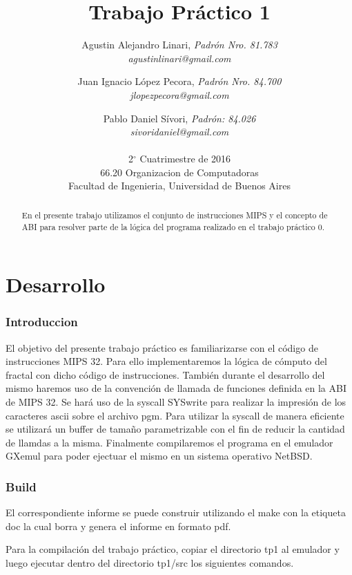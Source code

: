 \documentclass{article}
\title{Trabajo Práctico 1}
\author{
  Agustin Alejandro Linari, \textit{Padrón Nro. 81.783}\\
  \textit{agustinlinari@gmail.com}\\
  \and
  Juan Ignacio López Pecora, \textit{Padrón Nro. 84.700}\\
  \textit{jlopezpecora@gmail.com}\\
  \and
  Pablo Daniel Sívori, \textit{Padrón: 84.026}\\  
  \textit{sivoridaniel@gmail.com}\\
  \\
  \normalsize{2$^{\circ}$ Cuatrimestre de 2016}                           \\
  \normalsize{66.20 Organizacion de Computadoras}                  \\
  \normalsize{Facultad de Ingenieria, Universidad de Buenos Aires} \\
}
\begin{document}

\maketitle


\begin{abstract}
En el presente trabajo utilizamos el conjunto de instrucciones MIPS y el concepto de ABI para resolver parte de la lógica del programa realizado en el trabajo práctico 0. 
\end{abstract}

\clearpage

\tableofcontents
\clearpage

\part{Desarrollo}

\section{Introduccion}

El objetivo del presente trabajo práctico es familiarizarse con el código de instrucciones MIPS 32. Para ello implementaremos la lógica de cómputo del fractal con dicho código de instrucciones. También durante el desarrollo del mismo haremos uso de la convención de llamada de funciones definida en la ABI de MIPS 32. Se hará uso de la syscall SYSwrite para realizar la impresión de los caracteres ascii sobre el archivo pgm. Para utilizar la syscall de manera eficiente se utilizará un buffer de tamaño parametrizable con el fin de reducir la cantidad de llamdas a la misma. Finalmente compilaremos el programa en el emulador GXemul para poder ejectuar el mismo en un sistema operativo NetBSD.

\section{Build}
El correspondiente informe se puede construir utilizando el make con la etiqueta doc la cual borra y genera el informe en formato pdf.

Para la compilación del trabajo práctico, copiar el directorio tp1 al emulador y luego ejecutar dentro del directorio tp1/src los siguientes comandos.
\end{document}
